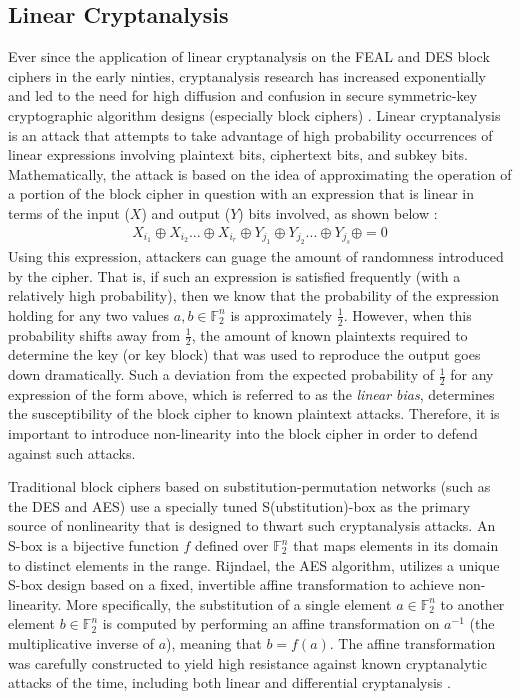 \documentclass[11pt]{article}
\newcommand{\field}[1]{\mathbb{#1}} %
\begin{document}
\subsection{Linear Cryptanalysis}
Ever since the application of linear cryptanalysis on the FEAL and DES block ciphers in the early ninties, cryptanalysis research has increased exponentially and led to the need for high diffusion and confusion in secure symmetric-key cryptographic algorithm designs (especially block ciphers) \cite{Heys01atutorial}. Linear cryptanalysis is an attack that attempts to take advantage of high probability occurrences of linear expressions involving plaintext bits, ciphertext bits, and subkey bits. Mathematically, the attack is based on the idea of approximating the operation of a portion of the block cipher in question with an expression that is linear in terms of the input ($X$) and output ($Y$) bits involved, as shown below \cite{Heys01atutorial}:
\begin{eqnarray*}
X_{i_{1}} \oplus X_{i_{2}} ... \oplus X_{i_{r}} \oplus Y_{j_{1}} \oplus Y_{j_{2}} ... \oplus Y_{j_{s}} \oplus  = 0
\end{eqnarray*}
Using this expression, attackers can guage the amount of randomness introduced by the cipher. That is, if such an expression is satisfied frequently (with a relatively high probability), then we know that the probability of the expression holding for any two values $a,b\in \field{F}_2^n$ is approximately $\frac{1}{2}$. However, when this probability shifts away from $\frac{1}{2}$, the amount of known plaintexts required to determine the key (or key block) that was used to reproduce the output goes down dramatically. Such a deviation from the expected probability of $\frac{1}{2}$ for any expression of the form above, which is referred to as the \emph{linear bias}, determines the susceptibility of the block cipher to known plaintext attacks. Therefore, it is important to introduce non-linearity into the block cipher in order to defend against such attacks.

Traditional block ciphers based on substitution-permutation networks (such as the DES and AES) use a specially tuned S(ubstitution)-box as the primary source of nonlinearity that is designed to thwart such cryptanalysis attacks. An S-box is a bijective function $f$ defined over $\field{F}_2^n$ that maps elements in its domain to distinct elements in the range. Rijndael, the AES algorithm, utilizes a unique S-box design based on a fixed, invertible affine transformation to achieve non-linearity. More specifically, the substitution of a single element $a \in \field{F}_2^n$ to another element $b \in \field{F}_2^n$ is computed by performing an affine transformation on $a^{-1}$ (the multiplicative inverse of $a$), meaning that $b = f(a)$. The affine transformation was carefully constructed to yield high resistance against known cryptanalytic attacks of the time, including both linear and differential cryptanalysis \cite{Daemen:2002:DRA}. 
\end{document}
